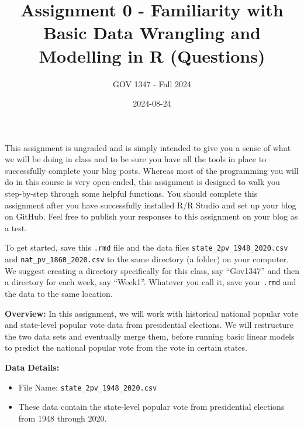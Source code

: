 \documentclass[
]{article}
\title{Assignment 0 - Familiarity with Basic Data Wrangling and
Modelling in R (Questions)}
\author{GOV 1347 - Fall 2024}
\date{2024-08-24}
\begin{document}
\maketitle

This assignment is ungraded and is simply intended to give you a sense
of what we will be doing in class and to be sure you have all the tools
in place to successfully complete your blog posts. Whereas most of the
programming you will do in this course is very open-ended, this
assignment is designed to walk you step-by-step through some helpful
functions. You should complete this assignment after you have
successfully installed R/R Studio and set up your blog on GitHub. Feel
free to publish your responses to this assignment on your blog as a
test.

To get started, save this \texttt{.rmd} file and the data files
\texttt{state\_2pv\_1948\_2020.csv} and \texttt{nat\_pv\_1860\_2020.csv}
to the same directory (a folder) on your computer. We suggest creating a
directory specifically for this class, say ``Gov1347'' and then a
directory for each week, say ``Week1''. Whatever you call it, save your
\texttt{.rmd} and the data to the same location.

\textbf{Overview:} In this assignment, we will work with historical
national popular vote and state-level popular vote data from
presidential elections. We will restructure the two data sets and
eventually merge them, before running basic linear models to predict the
national popular vote from the vote in certain states.

\textbf{Data Details:}

\begin{itemize}
\item
  File Name: \texttt{state\_2pv\_1948\_2020.csv}
\item
  These data contain the state-level popular vote from presidential
  elections from 1948 through 2020.
\end{itemize}
\end{document}
